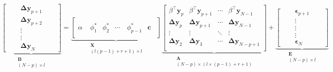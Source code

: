 \begin{equation} \label{eq:vecmatrix}
\underbrace{
                \left[ \begin{array}{ccc}
               \quad & \mathbf{\Delta y}_{p+1} & \quad \\ 
               \quad & \mathbf{\Delta y}_{p+2} & \quad \\
               \quad & \vdots & \quad \\ 
               \quad & \vdots & \quad \\  
               \quad & \mathbf{\Delta y}_N & \quad 
               \end{array} \right]}_{\substack{\mathbf{B}\\ (N-p) \times l }} =
   \underbrace{\left[ 
    \begin{array}{cccccc}
     \quad & \quad & \quad & \quad & \quad & \quad \\
     \alpha & \phi_1^*  & \phi_2^* & \cdots & \phi_{p-1}^* & \mathbf{c} \\  
     \quad &\quad &\quad & \quad & \quad & \quad
     \end{array} 
      \right]}_{\substack{ \mathbf{X}\\ (l(p-1)+r+1) \times l}}
\underbrace{\begin{bmatrix} 
   \beta^\intercal \mathbf{y}_{p} & 
   \beta^\intercal \mathbf{y}_{p+1}&
   \cdots & \beta^\intercal \mathbf{y}_{N-1} \\
   \mathbf{\Delta y}_p & \mathbf{\Delta y}_{p+1} & \cdots 
   & \mathbf{\Delta y}_{N-1} \\ 
   \vdots & \vdots & \ddots & \vdots \\
   \mathbf{\Delta y}_2 & \mathbf{\Delta y}_{3} & \cdots 
   & \mathbf{\Delta y}_{N-p+1} \\ 
   \end{bmatrix}}_{\substack{\mathbf{A} \\ (N-p) \times (l \times (p-1)+r+1) }}
+
\underbrace{\begin{bmatrix}
              \quad &\mathbf{\epsilon}_{p+1} & \quad \\ 
              \quad &\vdots & \quad\\ 
              \quad & \vdots & \quad\\
              \quad & \vdots & \quad\\
              \quad &\mathbf{\epsilon}_N & \quad
             \end{bmatrix}}_{\substack{\mathbf{E}\\ (N-p) \times l }} 
\end{equation}

